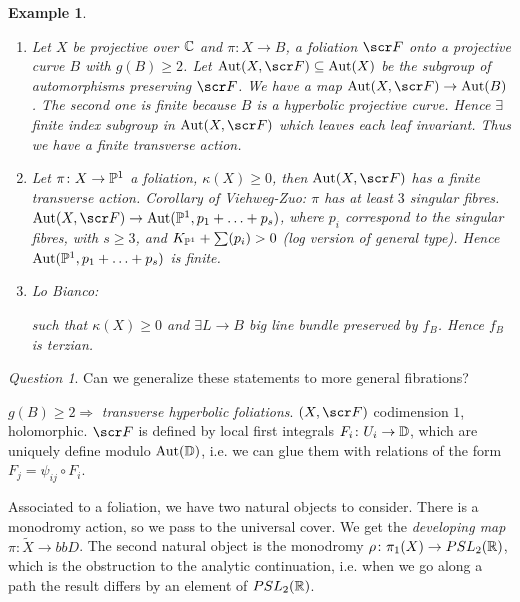 \documentclass[A4paper, british, reqno]{amsart}
\theoremstyle{darkgreentheorem}
\theoremstyle{darkbluedefinition}
\theoremstyle{darkredexample}
\newtheorem{exa}[thm]{Example}
\theoremstyle{remark}
\newtheorem{q}[thm]{Question}
\DeclareMathOperator{\Aut}{Aut}
\newcommand{\1}{\mathbbm{1}}
\newcommand{\sub}{\subseteq}
\begin{document}
\begin{exa}
    \begin{enumerate}
	\item Let $X$ be projective over $\C$ and $\pi\colon X\to B$, a foliation $\F$ onto a projective curve $B$ with $g(B)\geqslant 2$.
	    Let $\Aut(X,\F)\sub\Aut(X)$ be the subgroup of automorphisms preserving $\F$.
	    We have a map $\Aut(X,\F)\to \Aut(B)$.
	    The second one is finite because $B$ is a hyperbolic projective curve.
	    Hence $\exists $ finite index subgroup in $\Aut(X,\F)$ which leaves each leaf invariant.
	    Thus we have a finite transverse action.
	\item Let $\pi\colon X\to \P^{1}$ a foliation, $\kappa(X)\geqslant 0$, then $\Aut(X,\F)$ has a finite transverse action.
	    Corollary of Viehweg-Zuo: $\pi$ has at least $3$ singular fibres.
	    $\Aut(X,\F)\to \Aut(\P^{1},p_{1}+\ldots +p_{s})$, where $p_{i}$ correspond to the singular fibres, with $s\geqslant 3$, and $K_{\P^{1}}+\sum(p_{i}) >0$ (log version of general type).
	    Hence $\Aut(\P^{1},p_{1}+\ldots+p_{s})$ is finite.
	\item Lo Bianco:
	    \begin{center}
	    \end{center}
	    such that $\kappa(X)\geqslant 0$ and $\exists L\to B$ big line bundle preserved by $f_{B}$.
	    Hence $f_{B}$ is terzian.
    \end{enumerate}
\end{exa}

\begin{q}
    Can we generalize these statements to more general fibrations?
\end{q}
$g(B)\geqslant 2\Rightarrow $ \textit{transverse hyperbolic foliations}.
$(X,\F)$ codimension $1$, holomorphic.
$\F$ is defined by local first integrals $F_{i}\colon U_{i}\to \bbD$, which are uniquely define modulo $\Aut(\bbD)$, i.e. we can glue them with relations of the form $F_{j}=\psi_{ij}\circ F_{i}$.

Associated to a foliation, we have two natural objects to consider.
There is a monodromy action, so we pass to the universal cover.
We get the \textit{developing map} $\pi\colon \tilde{X}\to bbD$.
The second natural object is the monodromy $\rho\colon \pi_{1}(X)\to PSL_{2}(\R)$, which is the obstruction to the analytic continuation, i.e. when we go along a path the result differs by an element of $PSL_{2}(\R)$.
\end{document}
